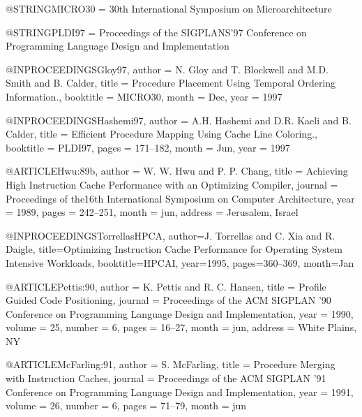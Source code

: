 @STRING{MICRO30 = {30th International Symposium on
                  Microarchitecture}}

@STRING{PLDI97 = {Proceedings of the SIGPLANS'97 Conference on
                  Programming Language Design and Implementation}}


@INPROCEEDINGS{Gloy97,
           author = {N. Gloy and T. Blockwell and M.D. Smith and
                  B. Calder},
           title = {Procedure Placement Using Temporal Ordering
                  Information.},
           booktitle = MICRO30,
           month = Dec,
           year = 1997
}

@INPROCEEDINGS{Hashemi97,
           author = {A.H. Hashemi and D.R. Kaeli and B. Calder},
           title = {Efficient Procedure Mapping Using Cache Line Coloring.},
           booktitle = PLDI97,
           pages = {171--182},
           month = Jun,
           year = 1997
}




@ARTICLE{Hwu:89b,
  author =       {W. W. Hwu and P. P. Chang},
  title =        {Achieving High Instruction Cache Performance with
                  an
                  Optimizing Compiler},
  journal =      {Proceedings of the16th International Symposium on
                  Computer Architecture},
  year =         1989,
  pages =        {242--251},
  month =        jun,
  address =      {Jerusalem, Israel}
}

@INPROCEEDINGS{TorrellasHPCA,
  author={J. Torrellas and C. Xia and R. Daigle},
  title={Optimizing Instruction Cache Performance for Operating System Intensive Workloads},
  booktitle=HPCAI,
  year=1995,
  pages={360--369},
  month=Jan
}


@ARTICLE{Pettis:90,
  author =       {K. Pettis and R. C. Hansen},
  title =        {Profile Guided Code Positioning},
  journal =      {Proceedings of the {ACM} {SIGPLAN} '90 Conference
                  on
                  Programming Language Design and Implementation},
  year =         1990,
  volume =       25,
  number =       6,
  pages =        {16--27},
  month =        jun,
  address =      {White Plains, NY}
}

@ARTICLE{McFarling:91,
  author =       {S. McFarling},
  title =        {Procedure Merging with Instruction Caches},
  journal =      {Proceedings of the ACM SIGPLAN '91 Conference on
                  Programming Language Design and Implementation},
  year =         1991,
  volume =       26,
  number =       6,
  pages =        {71--79},
  month =        jun
}


